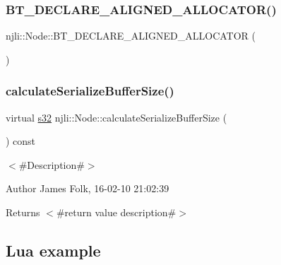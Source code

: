 \mbox{\label{classnjli_1_1_node_a8b08e4f3293dea50b2cf7ea54d217fa7}} 
\subsubsection{\texorpdfstring{B\+T\+\_\+\+D\+E\+C\+L\+A\+R\+E\+\_\+\+A\+L\+I\+G\+N\+E\+D\+\_\+\+A\+L\+L\+O\+C\+A\+T\+O\+R()}{BT\_DECLARE\_ALIGNED\_ALLOCATOR()}}
{\footnotesize\ttfamily njli\+::\+Node\+::\+B\+T\+\_\+\+D\+E\+C\+L\+A\+R\+E\+\_\+\+A\+L\+I\+G\+N\+E\+D\+\_\+\+A\+L\+L\+O\+C\+A\+T\+OR (\begin{DoxyParamCaption}{ }\end{DoxyParamCaption})\hspace{0.3cm}{\ttfamily [protected]}}

\mbox{\label{classnjli_1_1_node_a27d0c8349a4c0852fec2dfaa572945ab}} 
\subsubsection{\texorpdfstring{calculate\+Serialize\+Buffer\+Size()}{calculateSerializeBufferSize()}}
{\footnotesize\ttfamily virtual \mbox{\hyperlink{_util_8h_aa62c75d314a0d1f37f79c4b73b2292e2}{s32}} njli\+::\+Node\+::calculate\+Serialize\+Buffer\+Size (\begin{DoxyParamCaption}{ }\end{DoxyParamCaption}) const\hspace{0.3cm}{\ttfamily [virtual]}}



$<$\#\+Description\#$>$ 

\begin{DoxyAuthor}{Author}
James Folk, 16-\/02-\/10 21\+:02\+:39
\end{DoxyAuthor}
\begin{DoxyReturn}{Returns}
$<$\#return value description\#$>$
\end{DoxyReturn}
\hypertarget{classnjli_1_1_steering_behavior_wander_ex1}{}\subsection{Lua example}\label{classnjli_1_1_steering_behavior_wander_ex1}

